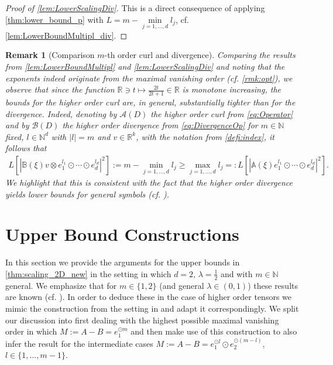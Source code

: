 \documentclass[a4paper, 10pt, twoside, notitlepage]{amsart}
\theoremstyle{plain}
\newtheorem{rmk}[prop]{Remark}
\newcommand{\R}{\mathbb{R}}
\newcommand{\N}{\mathbb{N}}
\newcommand{\A}{\mathcal{A}}
\renewcommand{\AA}{\mathbb{A}}
\begin{document}
		
                
			\begin{proof}[Proof of  \cref{lem:LowerScalingDiv}]
			This is a direct consequence of applying \cref{thm:lower_bound_p} with $L = m - \min\limits_{j=1,\dots,d}l_j$, cf. \cref{lem:LowerBoundMultipl_div}.
			\end{proof}
				
				
				
				\begin{rmk}[Comparison $m$-th order curl and divergence] \label{rmk:comp}
                                  Comparing the results from \cref{lem:LowerBoundMultipl} and \cref{lem:LowerScalingDiv} and noting that the exponents indeed originate from the maximal vanishing order (cf. \cref{rmk:opt}), we observe that since the function $\R \ni t \mapsto \frac{2t}{2t+1} \in \R$ is monotone increasing, the bounds for the higher order curl are, in general, substantially tighter than for the divergence.
                                  Indeed, denoting by $\A(D)$ the higher order curl from \cref{eq:Operator} and by $\mathcal{B}(D)$ the higher order divergence from \cref{eq:DivergenceOp} for $m\in \N$ fixed, $l\in \N^{d}$ with $|l|=m$ and $v\in \R^k$, with the notation from \cref{defi:index}, it follows that
\begin{align*}
L\left[|\mathbb{B}(\xi) v\otimes e_1^{l_1}\odot \cdots \odot e_{d}^{l_d}|^2 \right]:= m - \min\limits_{j=1,\dots,d} l_j \geq \max\limits_{j=1,\dots, d} l_j =: L\left[|\AA(\xi) e_1^{l_1}\odot \cdots \odot e_{d}^{l_d}|^2\right].
\end{align*}
We highlight that this is consistent with the fact that the higher order divergence yields lower bounds for general symbols (cf. \cite[Appendix B]{RRT23}).
\end{rmk}
		
		
		\section{Upper Bound Constructions}
		\label{sec:upper}
		
		In this section we provide the arguments for the upper bounds in \cref{thm:scaling_2D_new} in the setting in which $d=2$, $\lambda = \frac{1}{2}$ and with $m\in \N$ general. We emphasize that for $m\in \{1,2\}$ (and general $\lambda \in (0,1)$)
                these results are known (cf. \cite{CC15}). In order to deduce these in the case of higher order tensors we mimic the construction from the setting in \cite{CC15} and
		adapt it correspondingly. We split our discussion into first dealing with the highest possible maximal vanishing order in which $M:=A-B = e_1^{\odot m}$ and then make use of this construction to also infer the result
		for the intermediate cases $M:=A-B = e_1^{\odot l} \odot e_2^{\odot(m-l)}$, $l \in \{1,\dots,m-1\}$.
		
\end{document}
